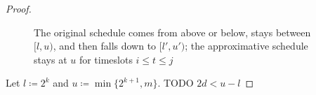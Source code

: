 \begin{proof}
\begin{figure}[H]
\end{figure}
\begin{figure}[H]
\captionsetup[subfigure]{labelformat=empty}
\begin{subfigure}[b]{0.49\textwidth}

\end{subfigure}
\hfill
\begin{subfigure}[b]{0.49\textwidth}

\end{subfigure}
\caption{The original schedule comes from above or below, stays between $[l,u)$, and then falls down to $[l',u')$; the approximative schedule stays at $u$ for timeslots $i\le t\le j$}
\end{figure}
Let $l\coloneqq 2^k$ and $u\coloneqq\min\{2^{k+1},m\}$. TODO $2d<u-l$


\end{proof}
